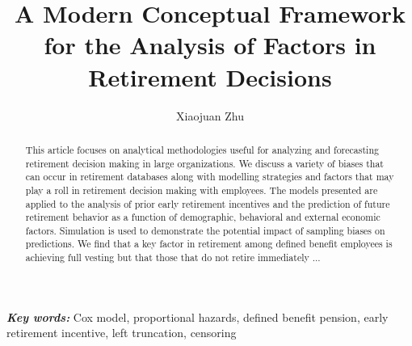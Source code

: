 \documentclass[12pt,letterpaper]{article}
\title{A Modern Conceptual Framework for the Analysis of Factors in Retirement Decisions}
\author{Xiaojuan Zhu}
\providecommand{\keywords}[1]{\textbf{\textit{Key words:}} #1} %
\begin{document}
\maketitle

\begin{abstract}
This article focuses on analytical methodologies useful for analyzing and forecasting retirement decision making in large organizations.  We discuss a variety of biases that can occur in retirement databases along with modelling strategies and factors that may play a roll in retirement decision making with employees.  The models presented are applied to the analysis of prior early retirement incentives and the prediction of future retirement behavior as a function of demographic, behavioral and external economic factors.  Simulation is used to demonstrate the potential impact of sampling biases on predictions. We find that a key factor in retirement among defined benefit employees is achieving full vesting but that those that do not retire immediately ...

\end{abstract}

\keywords {Cox model, proportional hazards, defined benefit pension, early retirement incentive, left truncation, censoring}


\end{document}
